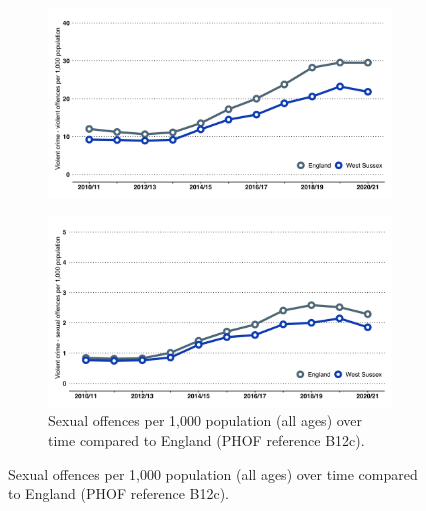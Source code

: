\begin{figure}
\begin{subfigure}[t]{0.45\textwidth}
        \includegraphics[width=\textwidth]{images/violent_offenses_line.png}
    \end{subfigure}
    \begin{subfigure}[t]{0.45\textwidth}
        \caption[Sexual offences per 1,000 population (all ages) over time]{Sexual offences per 1,000 population (all ages) over time compared to England (PHOF reference B12c).}\label{fig:sexual_off:time}
        \centering
        \includegraphics[width=\textwidth]{images/sexual_offences_line.png}
    \end{subfigure}
\end{figure}





